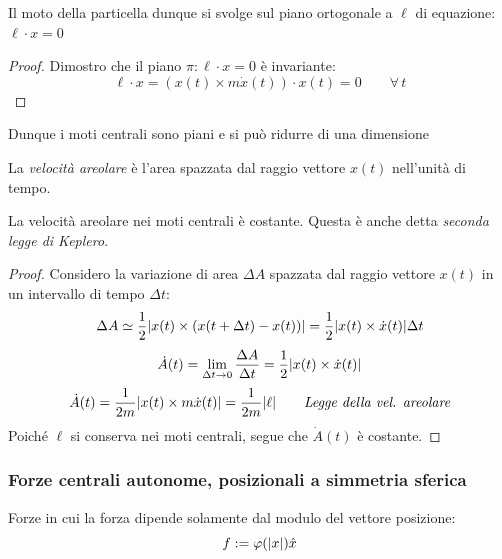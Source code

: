 \begin{proposition}
    Il moto della particella dunque si svolge sul piano ortogonale a $\ell$ di equazione: $\ell\cdot x =0$
\end{proposition}
\begin{proof}
    Dimostro che il piano $\pi:\ell\cdot x=0$ è invariante:
    \begin{equation}
        \ell\cdot x= (x(t)\times m\dot{x}(t))\cdot x(t)=0 \qquad\forall \, t
    \end{equation}
\end{proof}

\begin{remark}
    Dunque i moti centrali sono piani e si può ridurre di una dimensione
\end{remark}
\begin{definition}
    La \textit{velocità areolare } è l'area spazzata dal raggio vettore $x(t)$ nell'unità di tempo.
\end{definition}

\begin{proposition}
    La velocità areolare nei moti centrali è costante. Questa è anche detta \textit{seconda legge di Keplero}.
\end{proposition}
\begin{proof}
    Considero la variazione di area $\Delta A$ spazzata dal raggio vettore $x(t)$ in un intervallo di tempo $\Delta t$:
    \begin{equation*}
        \Delta A \simeq \frac{1}{2} \abs{ x(t) \times (x(t+\Delta t) - x(t)) } = \frac{1}{2} \abs{ x(t) \times \dot{x}(t) } \Delta t
    \end{equation*}
    \begin{equation}
        \dot{A}(t) = \lim_{\Delta t \to 0} \frac{\Delta A}{\Delta t} = \frac{1}{2} \abs{ x(t) \times \dot{x}(t) }
    \end{equation}
    \begin{equation}
        \dot{A}(t) = \frac{1}{2m} \abs{ x(t) \times m\dot{x}(t) } = \frac{1}{2m} \abs{ \ell } \qquad \textit{Legge della vel. areolare}
    \end{equation}
    Poiché $\ell$ si conserva nei moti centrali, segue che $\dot{A}(t)$ è costante.
\end{proof}



\subsubsection{Forze centrali autonome, posizionali a simmetria sferica}
Forze in cui la forza dipende solamente dal modulo del vettore posizione:
\begin{equation}
    f:= \varphi(\abs{x})\hat{x}
\end{equation}

